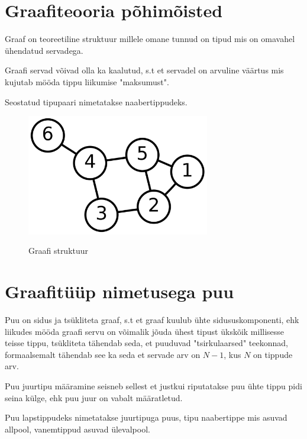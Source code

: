 \documentclass{trkut}
\begin{document}
\begin{appendices}

    \chapter{Graafiteooria põhimõisted}\label{lisa1}
    \normalsize
    Graaf on teoreetiline struktuur millele omane tunnud on tipud mis on omavahel ühendatud servadega.
    
    Graafi servad võivad olla ka kaalutud, s.t et servadel on arvuline väärtus mis kujutab mööda tippu liikumise "maksumust".

    Seostatud tipupaari nimetatakse naabertippudeks. \parencite{graaf}
    
    \begin{figure}[H]%
    \includegraphics[width=8cm]{graaf.png}%
    \caption{Graafi struktuur}%
    \label{graaf}%
    \end{figure}



    \chapter{Graafitüüp nimetusega puu}\label{lisa2}
    \tiny
    \normalsize

    Puu on sidus ja tsükliteta graaf, s.t et graaf kuulub ühte sidususkomponenti, ehk liikudes mööda graafi servu on võimalik jõuda ühest tipust ükskõik millisesse teisse tippu, tsükliteta tähendab seda, et puuduvad "tsirkulaarsed" teekonnad, formaalsemalt tähendab see ka seda et servade arv on $N-1$, kus $N$ on tippude arv.

    Puu juurtipu määramine seisneb sellest et justkui riputatakse puu ühte tippu pidi seina külge, ehk puu juur on vabalt määratletud.

    Puu lapstippudeks nimetatakse juurtipuga puus, tipu naabertippe mis asuvad allpool, vanemtippud asuvad ülevalpool. \parencite{puu}
   

\end{appendices}
\end{document}
